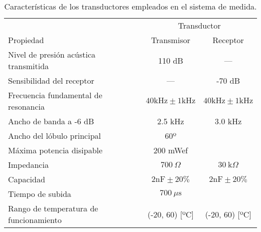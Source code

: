 \begin{table}
	\centering
	\begin{threeparttable}
	\begin{tabular}{l c c}
		\toprule
		& \multicolumn{2}{c}{Transductor} \\
		\cmidrule(l){2-3}
		Propiedad & Transmisor & Receptor \\
		\midrule
		Nivel de presión acústica transmitida & 110 dB & --- \\
		Sensibilidad del receptor & --- & -70 dB \\
		Frecuencia fundamental de resonancia
		& $40 \text{kHz} \pm 1 \text{kHz}$
		& $40 \text{kHz} \pm 1 \text{kHz}$ \\
		Ancho de banda a -6 dB & 2.5 kHz & 3.0 kHz \\
		Ancho del lóbulo principal & 60º & \\
		Máxima potencia disipable & 200 mWef & \\
		Impedancia & $700\ \Omega$ & $30\ \text{k}\Omega$ \\
		Capacidad & $2 \text{nF} \pm 20\%$
		& $2 \text{nF} \pm 20\%$ \\
		Tiempo de subida & $700\ \mu\text{s}$ & \\
		Rango de temperatura de funcionamiento %
		& (-20, 60) [ºC] & (-20, 60) [ºC] \\
		\bottomrule
	\end{tabular}
	\begin{TableNotes}
	\end{TableNotes}
	\end{threeparttable}
	\caption[Características de los transductores empleados en el
	sistema de medida]{Características de los transductores empleados
	en el sistema de medida.}
	\label{tab:transducers}
\end{table}

